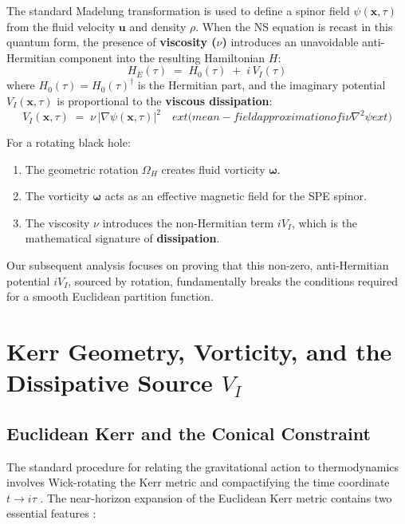 \documentclass[11pt]{article}
\begin{document}
The standard Madelung transformation is used to define a spinor field $\psi(\mathbf{x},\tau)$ from the fluid velocity $\mathbf{u}$ and density $\rho$. When the NS equation is recast in this quantum form, the presence of \textbf{viscosity ($\nu$)} introduces an unavoidable anti-Hermitian component into the resulting Hamiltonian $H$:
\begin{equation}\label{eq:HE_decomp}
    H_E(\tau) \;=\; H_0(\tau) \;+\; i\,V_I(\tau)
\end{equation}
where $H_0(\tau)=H_0(\tau)^\dagger$ is the Hermitian part, and the imaginary potential $V_I(\mathbf{x}, \tau)$ is proportional to the \textbf{viscous dissipation}:
\begin{equation}\label{eq:VI_basic_toolset}
    V_I(\mathbf x,\tau) \;=\; \nu\,|\nabla\psi(\mathbf x,\tau)|^2 \quad 	ext{(mean-field approximation of } i\nu\nabla^2\psi 	ext{)}
\end{equation}

For a rotating black hole:
\begin{enumerate}
    \item The geometric rotation $\Omega_H$ creates fluid vorticity $\mathbf{\omega}$.
    \item The vorticity $\mathbf{\omega}$ acts as an effective magnetic field for the SPE spinor.
    \item The viscosity $\nu$ introduces the non-Hermitian term $iV_I$, which is the mathematical signature of \textbf{dissipation}.
\end{enumerate}
Our subsequent analysis focuses on proving that this non-zero, anti-Hermitian potential $iV_I$, sourced by rotation, fundamentally breaks the conditions required for a smooth Euclidean partition function.

\section{Kerr Geometry, Vorticity, and the Dissipative Source $V_I$}

\subsection{Euclidean Kerr and the Conical Constraint}

The standard procedure for relating the gravitational action to thermodynamics involves Wick-rotating the Kerr metric\cite{Kerr1963} and compactifying the time coordinate $t \to i\tau$ \cite{GibbonsHawking1977}. The near-horizon expansion of the Euclidean Kerr metric\cite{Kerr1963} contains two essential features \cite{appendix_a1_kerr_expansion.tex}:
\end{document}
